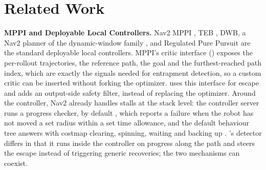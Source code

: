 \section{Related Work}\label{sec:related}

\noindent\textbf{MPPI and Deployable Local Controllers.} Nav2 MPPI \citep{nav2,mppi_orig}, TEB \citep{teb}, DWB, a Nav2 planner of the dynamic-window family \citep{dwa}, and Regulated Pure Pursuit \citep{rpp} are the standard deployable local controllers. MPPI's critic interface () exposes the per-rollout trajectories, the reference path, the goal and the furthest-reached path index, which are exactly the signals needed for entrapment detection, so a custom critic can be inserted without forking the optimizer. \sname{} uses this interface for escape and adds an output-side safety filter, instead of replacing the optimizer. Around the controller, Nav2 already handles stalls at the stack level: the controller server runs a progress checker, by default , which reports a failure when the robot has not moved a set radius within a set time allowance, and the default behaviour tree answers with costmap clearing, spinning, waiting and backing up \citep{nav2_progress,nav2_bt}. \sname's detector differs in that it runs inside the controller on progress along the path and steers the escape instead of triggering generic recoveries; the two mechanisms can coexist.

